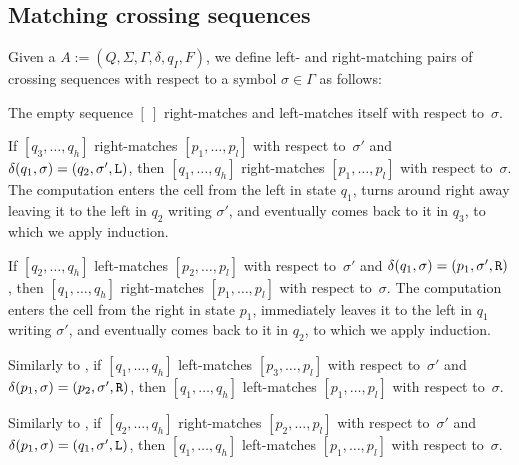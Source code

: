 \subsection{Matching crossing sequences}
\begin{defn}
	Given a \kDLA $A:=(Q,\Sigma,\Gamma,\delta,q_I,F)$, we define left- and right-matching pairs of crossing sequences with respect to a symbol $\sigma\in\Gamma$ as follows:
	\begin{rules}
		\item \label{itm:crossmatchswepDLA-1} The empty sequence $[~]$ right-matches and left-matches itself with respect to~$\sigma$.
		\item \label{itm:crossmatchswepDLA-2} If $[q_3,\dots,q_h]$ right-matches $[p_1,\dots,p_l]$ with respect to~$\sigma'$ and $\delta(q_1,\sigma)=(q_2,\sigma',\mathtt L)$, then $[q_1,\dots,q_h]$ right-matches $[p_1,\dots,p_l]$ with respect to~$\sigma$.
		The computation enters the cell from the left in state $q_1$, turns around right away leaving it to the left in $q_2$ writing $\sigma'$, and eventually comes back to it in $q_3$, to which we apply induction.
		\item \label{itm:crossmatchswepDLA-3} If $[q_2,\dots,q_h]$ left-matches $[p_2,\dots,p_l]$ with respect to~$\sigma'$ and $\delta(q_1,\sigma)=(p_1,\sigma',\mathtt R)$, then $[q_1,\dots,q_h]$ right-matches $[p_1,\dots,p_l]$ with respect to~$\sigma$.
		The computation enters the cell from the right in state $p_1$, immediately leaves it to the left in $q_1$ writing $\sigma'$, and eventually comes back to it in $q_2$, to which we apply induction.
		\item \label{itm:crossmatchswepDLA-4} Similarly to , if $[q_1,\dots,q_h]$ left-matches $[p_3,\dots,p_l]$ with respect to~$\sigma'$ and $\delta(p_1,\sigma)=(p_2,\sigma',\mathtt R)$, then $[q_1,\dots,q_h]$ left-matches $[p_1,\dots,p_l]$ with respect to~$\sigma$.
		\item \label{itm:crossmatchswepDLA-5} Similarly to , if $[q_2,\dots,q_h]$ right-matches $[p_2,\dots,p_l]$ with respect to~$\sigma'$ and $\delta(p_1,\sigma)=(q_1,\sigma',\mathtt L)$, then $[q_1,\dots,q_h]$ left-matches $[p_1,\dots,p_l]$ with respect to~$\sigma$.
	\end{rules}
\end{defn}

